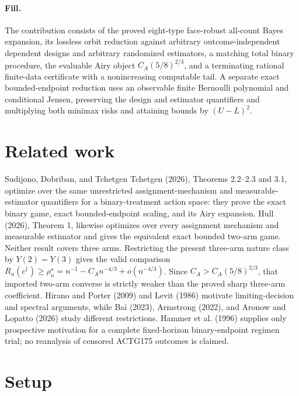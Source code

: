 \documentclass{article}
\begin{document}
\paragraph{Fill.} The contribution consists of the proved eight-type face-robust all-count Bayes expansion, its lossless orbit reduction against arbitrary outcome-independent dependent designs and arbitrary randomized estimators, a matching total binary procedure, the evaluable Airy object \(C_A(5/8)^{2/3}\), and a terminating rational finite-data certificate with a nonincreasing computable tail. A separate exact bounded-endpoint reduction uses an observable finite Bernoulli polynomial and conditional Jensen, preserving the design and estimator quantifiers and multiplying both minimax risks and attaining bounds by \((U-L)^2\).

\section{Related work}

Sudijono, Dobriban, and Tchetgen Tchetgen (2026), Theorems 2.2--2.3 and 3.1, optimize over the same unrestricted assignment-mechanism and measurable-estimator quantifiers for a binary-treatment action space: they prove the exact binary game, exact bounded-endpoint scaling, and its Airy expansion. Hull (2026), Theorem 1, likewise optimizes over every assignment mechanism and measurable estimator and gives the equivalent exact bounded two-arm game. Neither result covers three arms. Restricting the present three-arm nature class by \(Y(2)=Y(3)\) gives the valid comparison \(R_n(c^\dagger)\ge\rho_n^\star=n^{-1}-C_A n^{-4/3}+o(n^{-4/3})\). Since \(C_A>C_A(5/8)^{2/3}\), that imported two-arm converse is strictly weaker than the proved sharp three-arm coefficient. Hirano and Porter (2009) and Levit (1986) motivate limiting-decision and spectral arguments, while Bai (2023), Armstrong (2022), and Aronow and Lopatto (2026) study different restrictions. Hammer et al. (1996) supplies only prospective motivation for a complete fixed-horizon binary-endpoint regimen trial; no reanalysis of censored ACTG175 outcomes is claimed.

\section{Setup}
\end{document}
